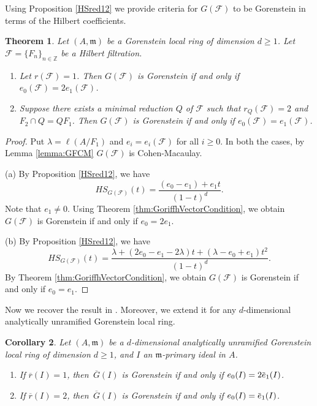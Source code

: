 \documentclass[12pt]{amsart}
\newtheorem{thm}{Theorem}[section]
\newtheorem{cor}[thm]{Corollary}
\theoremstyle{definition}
\theoremstyle{remark}
\numberwithin{equation}{section}
\newcommand{\m}{{\mathfrak m}}
\newcommand{\FF}{\mathcal{F}}
\newcommand{\ol}[1]{\mkern 1.5mu\overline{\mkern-1.5mu#1\mkern-1.5mu}\mkern 1.5mu} %
\newcommand{\olsi}[1]{\,\overline{\!{#1}}} %
\begin{document}
\par 
Using Proposition \ref{HSred12} we provide criteria for $G(\FF)$ to be Gorenstein in terms of the Hilbert coefficients.

\begin{thm}\label{thm:GorRedu12}     
Let $(A, \m) $ be a Gorenstein local ring of dimension $d \ge 1$.  Let $\mathcal{F} = \{F_n\}_{n \in \mathbb{Z}}$ be a Hilbert filtration.
\begin{enumerate}
 \item[\rm{(a)}] Let $r(\FF) = 1$. Then $G(\FF)$ is Gorenstein if and only if $e_0(\FF) = 2e_1(\FF)$.
 \item[\rm{(b)}] Suppose there exists a minimal reduction $Q$ of $\FF$ such that $r_Q(\FF)=2$ and $F_2 \cap Q = QF_1$. 
Then $G(\FF)$ is Gorenstein if and only if $e_0(\FF) = e_1(\FF)$.
\end{enumerate}
\end{thm}

\begin{proof} 
Put $\lambda=\ell(A/F_1)$ and $e_i=e_i(\FF)$ for all $i \ge 0$. 
In both the cases, by Lemma \ref{lemma:GFCM}  $G(\FF)$ is Cohen-Macaulay. 
\par \noindent 
{(a)}
By Proposition \ref{HSred12}, we have
\[
HS_{G(\FF)}(t)= \frac{(e_0- e_1) + e_1t}{(1-t)^d}.
\] 
Note that $e_1 \neq 0$. Using Theorem \ref{thm:GoriffhVectorCondition}, we obtain $G(\FF)$ is Gorenstein if and only if $e_0 = 2e_1$. 

\par \noindent
{(b)} 
By Proposition \ref{HSred12}, we have
\[
HS_{G(\FF)}(t)=\frac{\lambda + (2e_0-e_1-2\lambda)t + 
(\lambda-e_0+e_1)t^2}{(1-t)^d}.
\]
By Theorem \ref{thm:GoriffhVectorCondition}, we obtain 
$G(\FF)$ is Gorenstein if and only if $e_0=e_1$. 
\end{proof}



%

\par 
Now we recover the result in \cite[Theorem 2.1]{OWY6}. Moreover, we extend it for any $d$-dimensional analytically unramified Gorenstein local ring. 

\begin{cor}
\label{cor:red12_normal}
Let $(A, \m) $ be a $d$-dimensional analytically unramified Gorenstein 
local ring of dimension $d \geq 1$, and $I$ an $\m$-primary ideal 
in $A$.  
\begin{enumerate}
\item[\rm{(a)}] If $\overline{r}(I) = 1$, then $\olsi{G}(I)$ is Gorenstein if and only if $e_0(I) = 2\ol{e}_1(I)$.
\item[\rm{(b)}] If $\overline{r}(I) = 2$, then $\olsi{G}(I)$ is Gorenstein if and only if $e_0(I) = \ol{e}_1(I)$.
\end{enumerate}
\end{cor}
\end{document}
